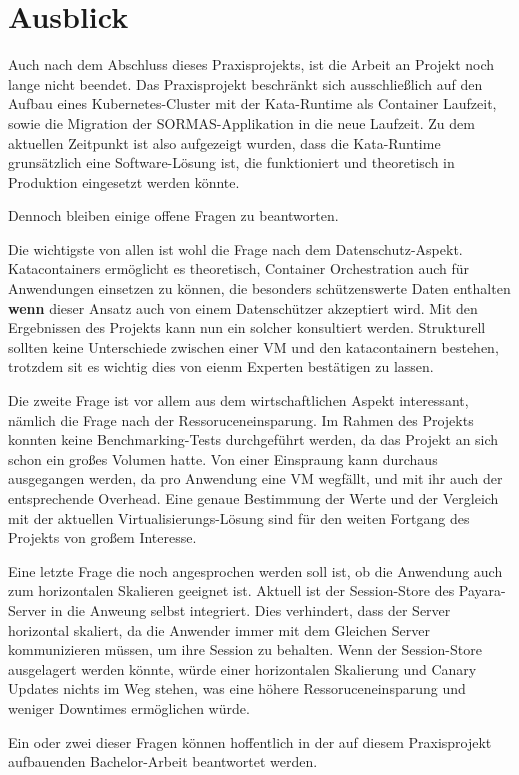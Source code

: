 \chapter{Ausblick}

Auch nach dem Abschluss dieses Praxisprojekts, ist die Arbeit an Projekt noch lange nicht beendet.
Das Praxisprojekt beschränkt sich ausschließlich auf den Aufbau eines Kubernetes-Cluster mit der Kata-Runtime als Container Laufzeit, sowie die Migration der \ac{SORMAS}-Applikation in die neue Laufzeit.
Zu dem aktuellen Zeitpunkt ist also aufgezeigt wurden, dass die Kata-Runtime grunsätzlich eine Software-Lösung ist, die funktioniert und theoretisch in Produktion eingesetzt werden könnte.

Dennoch bleiben einige offene Fragen zu beantworten.

Die wichtigste von allen ist wohl die Frage nach dem Datenschutz-Aspekt.
Katacontainers ermöglicht es theoretisch, Container Orchestration auch für Anwendungen einsetzen zu können, die besonders schützenswerte Daten enthalten \textbf{wenn} dieser Ansatz auch von einem Datenschützer akzeptiert wird.
Mit den Ergebnissen des Projekts kann nun ein solcher konsultiert werden. 
Strukturell sollten keine Unterschiede zwischen einer VM und den katacontainern bestehen, trotzdem sit es wichtig dies von eienm Experten bestätigen zu lassen.

Die zweite Frage ist vor allem aus dem wirtschaftlichen Aspekt interessant, nämlich die Frage nach der Ressoruceneinsparung.
Im Rahmen des Projekts konnten keine Benchmarking-Tests durchgeführt werden, da das Projekt an sich schon ein großes Volumen hatte.
Von einer Einspraung kann durchaus ausgegangen werden, da pro Anwendung eine \ac{VM} wegfällt, und mit ihr auch der entsprechende Overhead.
Eine genaue Bestimmung der Werte und der Vergleich mit der aktuellen Virtualisierungs-Lösung sind für den weiten Fortgang des Projekts von großem Interesse.

Eine letzte Frage die noch angesprochen werden soll ist, ob die Anwendung auch zum horizontalen Skalieren geeignet ist.
Aktuell ist der Session-Store des Payara-Server in die Anweung selbst integriert. 
Dies verhindert, dass der Server horizontal skaliert, da die Anwender immer mit dem Gleichen Server kommunizieren müssen, um ihre Session zu behalten.
Wenn der Session-Store ausgelagert werden könnte, würde einer horizontalen Skalierung und Canary Updates nichts im Weg stehen, was eine höhere Ressoruceneinsparung und weniger Downtimes ermöglichen würde.

Ein oder zwei dieser Fragen können hoffentlich in der auf diesem Praxisprojekt aufbauenden Bachelor-Arbeit beantwortet werden. 